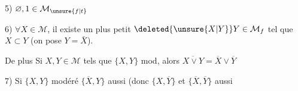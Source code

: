 5) $\varnothing,1\in\mathcal M_{\unsure{f|t}}$

6) $\forall X\in\mathcal M$, il existe un plus petit $\deleted{\unsure{X|Y}}Y\in\mathcal M_f$ tel que $X\subset Y$ (on pose $Y=\bar X$).

De plus Si $X,Y\in\mathcal M$ tels que $\{X,Y\}$ mod, alors $\overline{X\vee Y}=\overline X\vee\overline Y$

7) Si $\{X,Y\}$ modéré $\{\overline X,Y\}$ aussi (donc $\{X,\overline Y\}$ et $\{\overline X,\overline Y\}$ aussi
